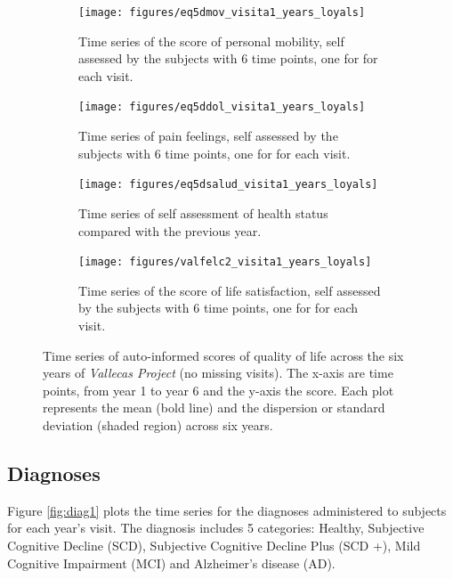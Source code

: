 \documentclass[11pt]{article}
\theoremstyle{definition}
\theoremstyle{remark}
\begin{document}
\begin{figure}[H]
    \centering
    \begin{subfigure}[t]{0.45\textwidth}
        \centering
        \texttt{[image: figures/eq5dmov\_visita1\_years\_loyals]}
        \caption{Time series of the score of personal mobility, self assessed by the subjects with 6 time points, one for for each visit.}
    \end{subfigure}
    \hfill 
    \begin{subfigure}[t]{0.45\textwidth}
        \centering
        \texttt{[image: figures/eq5ddol\_visita1\_years\_loyals]}
        \caption{Time series of pain feelings, self assessed by the subjects with 6 time points, one for for each visit.}
    \end{subfigure}%
    
     \begin{subfigure}[t]{0.45\textwidth}
        \centering
        \texttt{[image: figures/eq5dsalud\_visita1\_years\_loyals]}
        \caption{Time series of self assessment of health status compared with the previous year.}
    \end{subfigure}
    \hfill
    \begin{subfigure}[t]{0.45\textwidth}
        \centering
        \texttt{[image: figures/valfelc2\_visita1\_years\_loyals]}
        \caption{Time series of the score of life satisfaction, self assessed by the subjects with 6 time points, one for for each visit.}
    \end{subfigure}%
    \caption{Time series of auto-informed scores of quality of life across the six years of \emph{Vallecas Project} (no missing visits). The x-axis are time points, from year 1 to year 6 and the y-axis the score. Each plot represents the mean (bold line) and the dispersion or standard deviation (shaded region) across six years.}
    \label{fig:qol4}
\end{figure}

\subsection{Diagnoses}
\label{sse:diagn}

Figure \ref{fig:diag1} plots the time series for the diagnoses administered to subjects for each year's visit. The diagnosis includes 5 categories: Healthy, Subjective Cognitive Decline (SCD), Subjective Cognitive Decline Plus (SCD +), Mild Cognitive Impairment (MCI) and Alzheimer's disease (AD).
\end{document}
